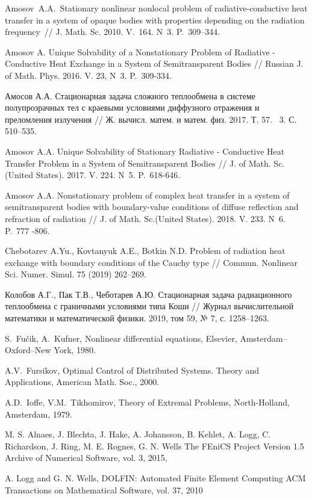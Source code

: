 \documentclass[12pt]{article}
\begin{document}
\begin{thebibliography}{999}
        Amosov~A.A.\ Stationary nonlinear nonlocal problem of
        radiative-conductive heat transfer in a system of opaque bodies
        with properties depending on the radiation frequency~// J\@.
        Math. Sc. 2010. V.~164. N~3. P.~309--344.

        Amosov A. Unique Solvability of a Nonstationary Problem of Radiative - Conductive
        Heat Exchange in a System of Semitransparent Bodies // Russian J. of Math.
        Phys. 2016. V. 23, N~3. P.~309-334.

        Амосов А.А. Стационарная задача сложного теплообмена в системе полупрозрачных тел с
        краевыми условиями диффузного отражения и преломления излучения // Ж.
        вычисл. матем. и матем. физ. 2017. Т. 57. \textnumero~3. С. 510--535.

        Amosov A.A. Unique Solvability of Stationary Radiative - Conductive Heat Transfer
        Problem in a System of Semitransparent Bodies // J. of Math.
        Sc.(United States). 2017. V. 224. N~5. P.~618-646.

        Amosov A.A. Nonstationary problem of complex heat transfer in a system of
        semitransparent bodies with boundary-value conditions of diffuse reflection and refraction
        of radiation // J. of Math. Sc.(United States). 2018. V. 233. N~6. P.~777 -806.

        Chebotarev A.Yu., Kovtanyuk A.E., Botkin N.D\@.
        Problem of radiation heat exchange with boundary conditions of the Cauchy type
        // Commun. Nonlinear Sci. Numer. Simul. 75 (2019) 262--269.

        Колобов А.Г., Пак Т.В., Чеботарев А.Ю.
        Стационарная задача радиационного теплообмена с граничными условиями типа Коши
        // Журнал вычислительной математики и математической физики.
        2019, том 59, № 7, с. 1258--1263.


         S.~Fu\v{c}ik, A.~Kufner, Nonlinear differential equations,
        Elsevier, Amsterdam--Oxford--New York, 1980.

         A.V.~Fursikov, Optimal Control of Distributed
        Systems. Theory and Applications, American Math. Soc., 2000.

         A.D.~Ioffe, V.M.~Tikhomirov, Theory of Extremal
        Problems, North-Holland, Amsterdam, 1979.

         M. S. Alnaes, J. Blechta, J. Hake, A. Johansson,
        B. Kehlet, A. Logg, C. Richardson, J. Ring, M. E. Rognes, G. N. Wells
        The FEniCS Project Version 1.5
        Archive of Numerical Software, vol. 3, 2015,

         A. Logg and G. N. Wells, DOLFIN: Automated Finite Element Computing
        ACM Transactions on Mathematical Software, vol. 37, 2010


    \end{thebibliography}
\end{document}
